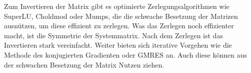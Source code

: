 Zum Invertieren der Matrix gibt es optimierte Zerlegungsalgorithmen wie SuperLU, Choldmod oder Mumps, die die schwache Besetzung der Matrizen ausnützen, um diese effizient zu zerlegen.
Was das Zerlegen noch effizienter macht, ist die Symmetrie der Systemmatrix.
Nach dem Zerlegen ist das Invertieren stark vereinfacht.
Weiter bieten sich iterative Vorgehen wie die Methode des konjugierten Gradienten oder GMRES an.
Auch diese können aus der schwachen Besetzung der Matrix Nutzen ziehen.
